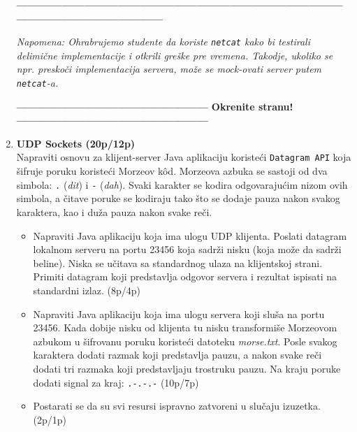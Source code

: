 \documentclass[]{article}
\begin{document}
\begin{enumerate}
\vspace{15pt}
\begin{center}
  \textbf{------------------------------------------------------------------------------------------------------------------------------}
\end{center}
\textit{Napomena: Ohrabrujemo studente da koriste \texttt{netcat} kako bi testirali delimi\v{c}ne implementacije i otkrili gre\v{s}ke pre vremena. Takodje, ukoliko se npr. presko\v{c}i implementacija servera, mo\v{z}e se mock-ovati server putem \texttt{netcat}-a.} 
\begin{center}
  \textbf{--------------------------------------------------- Okrenite stranu! ---------------------------------------------------}
\end{center}

\newpage

\item \textbf{UDP Sockets (20p/12p)}
\\Napraviti osnovu za klijent-server Java aplikaciju koriste\'c{}i \texttt{Datagram API} koja šifruje poruku koriste\'c{}i Morzeov k\^od. Morzeova azbuka se sastoji od dva simbola: \texttt{.} (\emph{dit}) i \texttt{-} (\emph{dah}). Svaki karakter se kodira odgovaraju\'c{}im nizom ovih simbola, a \v{c}itave poruke se kodiraju tako \v{s}to se dodaje pauza nakon svakog karaktera, kao i du\v{z}a pauza nakon svake re\v{c}i.

\begin{itemize}
  \item Napraviti Java aplikaciju koja ima ulogu UDP klijenta. Poslati datagram lokalnom serveru na portu 23456 koja sadrži nisku (koja može da sadrži beline). Niska se učitava sa standardnog ulaza na klijentskoj strani. Primiti datagram koji predstavlja odgovor servera i rezultat ispisati na standardni izlaz. \hfill(8p/4p)
  \item Napraviti Java aplikaciju koja ima ulogu servera koji sluša na portu 23456. Kada dobije nisku od klijenta tu nisku transformiše Morzeovom azbukom u šifrovanu poruku koriste\'c{}i datoteku \textit{morse.txt}. Posle svakog karaktera dodati razmak koji predstavlja pauzu, a nakon svake re\v{c}i dodati tri razmaka koji predstavljaju trostruku pauzu. Na kraju poruke dodati signal za kraj: \texttt{.-.-.-} \hfill(10p/7p)
  \item Postarati se da su svi resursi ispravno zatvoreni u slučaju izuzetka. \hfill(2p/1p)
\end{itemize}


\end{enumerate}
\end{document}
